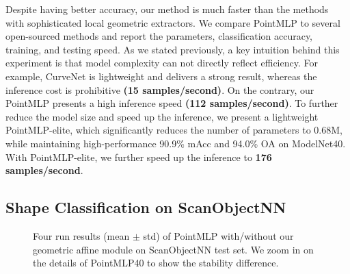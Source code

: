 Despite having better accuracy, our method is much faster than the methods with sophisticated local geometric extractors. We compare PointMLP to several open-sourced methods and report the parameters, classification accuracy, training, and testing speed. As we stated previously, a key intuition behind this experiment is that model complexity can not directly reflect efficiency. For example, CurveNet is lightweight and delivers a strong result, whereas the inference cost is prohibitive \textbf{(15 samples/second)}. On the contrary, our PointMLP presents a high inference speed \textbf{(112 samples/second)}. To further reduce the model size and speed up the inference, we present a lightweight PointMLP-elite, which significantly reduces the number of parameters to 0.68M, while maintaining high-performance 90.9\% mAcc and 94.0\% OA on ModelNet40. With PointMLP-elite, we further speed up the inference to \textbf{176 samples/second}.

\subsection{Shape Classification on ScanObjectNN}
\begin{figure}[!t]
    \centering
    \caption{Four run results (mean $\pm$ std) of PointMLP with/without our geometric affine module on ScanObjectNN test set. We zoom in on the details of PointMLP40 to show the stability difference.}
    \label{fig:affine_module}
\end{figure}

